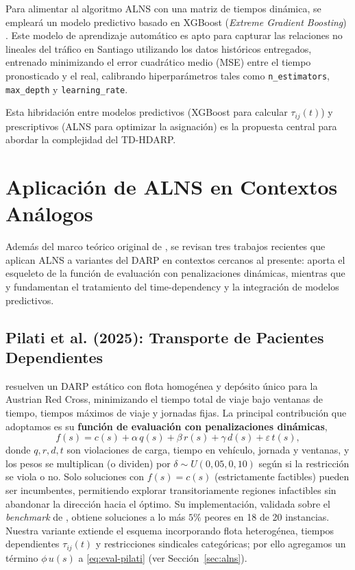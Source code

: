 Para alimentar al algoritmo ALNS con una matriz de tiempos dinámica, se empleará un modelo predictivo basado en XGBoost (\textit{Extreme Gradient Boosting}) \cite{Chen2016}. Este modelo de aprendizaje automático es apto para capturar las relaciones no lineales del tráfico en Santiago utilizando los datos históricos entregados, entrenado minimizando el error cuadrático medio (MSE) entre el tiempo pronosticado y el real, calibrando hiperparámetros tales como \texttt{n\_estimators}, \texttt{max\_depth} y \texttt{learning\_rate}.

Esta hibridación entre modelos predictivos (XGBoost para calcular $\tau_{ij}(t)$) y prescriptivos (ALNS para optimizar la asignación) es la propuesta central para abordar la complejidad del TD-HDARP.

\section{Aplicación de ALNS en Contextos Análogos}
\label{sec:papers}

Además del marco teórico original de \cite{Ropke2006}, se revisan tres trabajos recientes que aplican ALNS a variantes del DARP en contextos cercanos al presente: \cite{Pilati2025} aporta el esqueleto de la función de evaluación con penalizaciones dinámicas, mientras que \cite{Zhao2022} y \cite{Portell2024} fundamentan el tratamiento del time-dependency y la integración de modelos predictivos.

\subsection{Pilati et al. (2025): Transporte de Pacientes Dependientes}
\cite{Pilati2025} resuelven un DARP estático con flota homogénea y depósito único para la Austrian Red Cross, minimizando el tiempo total de viaje bajo ventanas de tiempo, tiempos máximos de viaje y jornadas fijas. La principal contribución que adoptamos es su \textbf{función de evaluación con penalizaciones dinámicas},
\begin{equation}
\label{eq:eval-pilati}
f(s) = c(s) + \alpha\, q(s) + \beta\, r(s) + \gamma\, d(s) + \varepsilon\, t(s),
\end{equation}
donde $q, r, d, t$ son violaciones de carga, tiempo en vehículo, jornada y ventanas, y los pesos se multiplican (o dividen) por $\delta\sim U(0{,}05,0{,}10)$ según si la restricción se viola o no. Solo soluciones con $f(s)=c(s)$ (estrictamente factibles) pueden ser incumbentes, permitiendo explorar transitoriamente regiones infactibles sin abandonar la dirección hacia el óptimo. Su implementación, validada sobre el \textit{benchmark} de \cite{Parragh2011}, obtiene soluciones a lo más $5\%$ peores en 18 de 20 instancias. Nuestra variante extiende el esquema incorporando flota heterogénea, tiempos dependientes $\tau_{ij}(t)$ y restricciones sindicales categóricas; por ello agregamos un término $\phi\,u(s)$ a \eqref{eq:eval-pilati} (ver Sección~\ref{sec:alns}).

